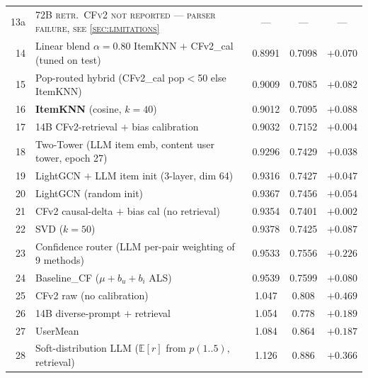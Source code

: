 \documentclass[11pt,a4paper]{article}
\begin{document}
\begin{table}[H]
\begin{tabular}{rlccc}
13a & \textsc{72B retr.\ CFv2 not reported — parser failure, see \cref{sec:limitations}} & — & — & — \\
14 & Linear blend $\alpha{=}0.80$ ItemKNN $+$ CFv2\_cal (tuned on test)              & 0.8991        & 0.7098 & $+0.070$ \\
15 & Pop-routed hybrid (CFv2\_cal pop$<$50 else ItemKNN)                             & 0.9009        & 0.7085 & $+0.082$ \\
16 & \textbf{ItemKNN} (cosine, $k{=}40$)                                             & 0.9012        & 0.7095 & $+0.088$ \\
17 & 14B CFv2-retrieval $+$ bias calibration                                         & 0.9032        & 0.7152 & $+0.004$ \\
18 & Two-Tower (LLM item emb, content user tower, epoch 27)                         & 0.9296        & 0.7429 & $+0.038$ \\
19 & LightGCN $+$ LLM item init (3-layer, dim 64)                                   & 0.9316        & 0.7427 & $+0.047$ \\
20 & LightGCN (random init)                                                          & 0.9367        & 0.7456 & $+0.054$ \\
21 & CFv2 causal-delta $+$ bias cal (no retrieval)                                   & 0.9354        & 0.7401 & $+0.002$ \\
22 & SVD ($k{=}50$)                                                                   & 0.9378        & 0.7425 & $+0.087$ \\
23 & Confidence router (LLM per-pair weighting of 9 methods)                        & 0.9533        & 0.7556 & $+0.226$ \\
24 & Baseline\_CF ($\mu{+}b_u{+}b_i$ ALS)                                             & 0.9539        & 0.7599 & $+0.080$ \\
25 & CFv2 raw (no calibration)                                                       & 1.047         & 0.808  & $+0.469$ \\
26 & 14B diverse-prompt $+$ retrieval                                                & 1.054         & 0.778  & $+0.189$ \\
27 & UserMean                                                                         & 1.084         & 0.864  & $+0.187$ \\
28 & Soft-distribution LLM ($\mathbb{E}[r]$ from $p(1..5)$, retrieval)               & 1.126         & 0.886  & $+0.366$ \\

\end{tabular}
\end{table}
\end{document}
